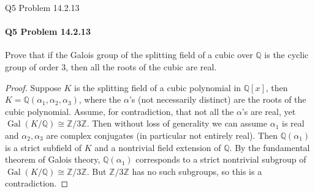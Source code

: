 \documentclass[12pt]{article}
\newenvironment{fullbox}{\begin{lrbox}{\savefullbox}\begin{minipage}{\dimexpr\textwidth-2\fboxsep\relax}}{\end{minipage}\end{lrbox}\begin{center}\framebox[\textwidth]{\usebox{\savefullbox}}\end{center}}
\newenvironment{pbox}[1][]{\begin{fullbox}\ifx#1\empty\else\paragraph{#1}\fi}{\end{fullbox}}
\newcommand{\Z}{\mathbb{Z}}
\newcommand{\Q}{\mathbb{Q}}
\newcommand{\<}{\langle}
\renewcommand{\>}{\rangle}
\newcommand{\isom}{\cong}
\DeclareMathOperator{\Gal}{Gal}
\begin{document}
\newpage
\begin{pbox}[Q5 Problem 14.2.13]
    Prove that if the Galois group of the splitting field of a cubic over $\Q$ is the cyclic group of order $3$, then all the roots of the cubic are real. 
\end{pbox}

\begin{proof}
    Suppose $K$ is the splitting field of a cubic polynomial in $\Q[x]$, then $K = \Q(\alpha_1, \alpha_2, \alpha_3)$, where the $\alpha$'s (not necessarily distinct) are the roots of the cubic polynomial. Assume, for contradiction, that not all the $\alpha$'s are real, yet $\Gal(K/\Q) \isom \Z/3\Z$. Then without loss of generality we can assume $\alpha_1$ is real and $\alpha_2, \alpha_3$ are complex conjugates (in particular not entirely real). Then $\Q(\alpha_1)$ is a strict subfield of $K$ and a nontrivial field extension of $\Q$. By the fundamental theorem of Galois theory, $\Q(\alpha_1)$ corresponds to a strict nontrivial subgroup of $\Gal(K/\Q) \isom \Z/3\Z$. But $\Z/3\Z$ has no such subgroups, so this is a contradiction.

\end{proof}
\end{document}
